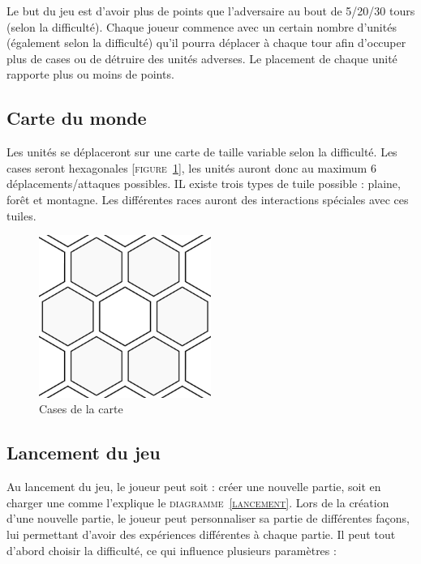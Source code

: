 Le but du jeu est d'avoir plus de points que l'adversaire au bout de 5/20/30 tours (selon la difficulté). Chaque joueur commence avec un certain nombre d'unités (également selon la difficulté) qu'il pourra déplacer à chaque tour afin d'occuper plus de cases ou de détruire des unités adverses. Le placement de chaque unité rapporte plus ou moins de points.

\subsection{Carte du monde}

Les unités se déplaceront sur une carte de taille variable selon la difficulté. Les cases seront hexagonales [\textsc{figure~\ref{cases}}], les unités auront donc au maximum 6 déplacements/attaques possibles. IL existe trois types de tuile possible : plaine, forêt et montagne. Les différentes races auront des interactions spéciales avec ces tuiles.

\begin{figure}[!h]
\centering
\includegraphics[width=0.5\textwidth]{img/hexagonal.png}
\caption{Cases de la carte}
\label{cases}
\end{figure}

\subsection{Lancement du jeu}

Au lancement du jeu, le joueur peut soit : \newline créer une nouvelle partie, soit en charger une comme l'explique le \textsc{diagramme~\ref{lancement}}. Lors de la création d'une nouvelle partie, le joueur peut personnaliser sa partie de différentes façons, lui permettant d'avoir des expériences différentes à chaque partie. Il peut tout d'abord choisir la difficulté, ce qui influence plusieurs paramètres :

